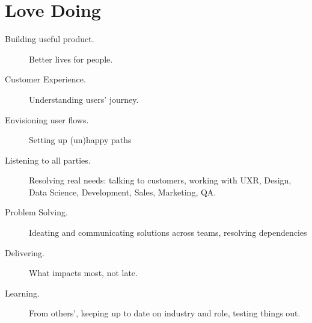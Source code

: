 \section*{Love Doing}

\begin{description}
\item[Building useful product.] Better lives for people. %
\item[Customer Experience.]
Understanding users' journey.
\item[Envisioning user flows.] Setting up (un)happy paths
\item[Listening to all parties.] Resolving real needs: %
talking to customers,
working with UXR,
Design,
Data Science,
Development,
Sales,
Marketing,
QA.
\item[Problem Solving.]%
Ideating and communicating solutions across teams, resolving dependencies
\item[Delivering.] What impacts most, not late.
\item[Learning.]
From others', %
keeping up to date on industry and role, testing things out.
\end{description}
